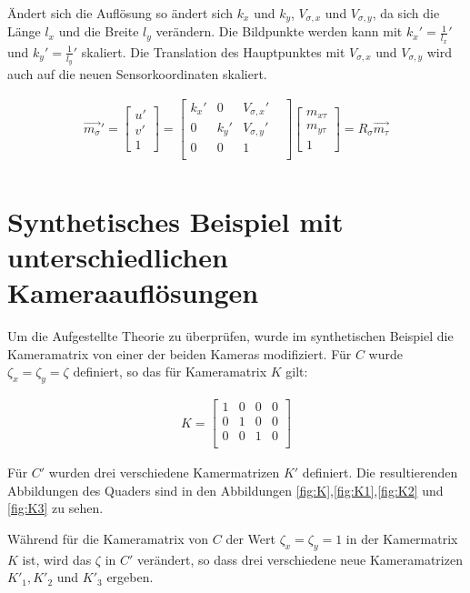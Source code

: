 Ändert sich die Auflösung so ändert sich $k_x$ und $k_y$, $V_{\sigma,x}$ und $V_{\sigma,y}$, da sich die Länge $l_x$ und die Breite $l_y$ verändern. Die Bildpunkte werden kann mit $k_x' = \frac{1}{l_x}'$ und $k_y' = \frac{1}{l_y}'$ skaliert. Die Translation des Hauptpunktes mit  $V_{\sigma,x}$ und $V_{\sigma,y}$ wird auch auf die neuen Sensorkoordinaten skaliert.

\begin{gather}
\vec{m_\sigma}'=\begin{bmatrix}u' \\v'\\1 \end{bmatrix}=
\begin{bmatrix}
k_x'&0&V_{\sigma,x}'\\
0&k_y'&V_{\sigma,y}'\\
0&0&1&\\
\end{bmatrix}
\begin{bmatrix}m_{x \tau}\\ m_{y \tau}\\ 1\end{bmatrix}= R_\sigma \vec{m_\tau}\\
\end{gather}



\section{Synthetisches Beispiel mit unterschiedlichen Kameraauflösungen}

Um die Aufgestellte Theorie zu überprüfen, wurde im synthetischen Beispiel die Kameramatrix von einer der beiden Kameras modifiziert. Für $C$ wurde $\zeta_x = \zeta_y = \zeta$ definiert, so das für Kameramatrix $K$ gilt:

\begin{gather}
	K = \begin{bmatrix}
	1&0&0&0\\
	0&1&0&0\\
	0&0&1&0\\
	\end{bmatrix}
\end{gather}

Für $C'$ wurden drei verschiedene Kamermatrizen $K'$ definiert. Die resultierenden Abbildungen des Quaders sind in den Abbildungen \ref{fig:K},\ref{fig:K1},\ref{fig:K2} und \ref{fig:K3} zu sehen.

Während für die Kameramatrix von $C$ der Wert  $\zeta_x = \zeta_y = 1$ in der Kamermatrix $K$ ist, wird das $\zeta$ in $C'$ verändert, so dass drei verschiedene neue Kameramatrizen $K'_1, K'_2$ und $K'_3$ ergeben. 



